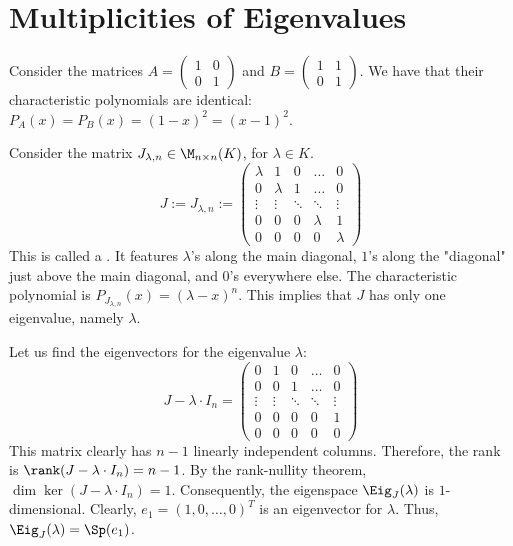 \section{Multiplicities of Eigenvalues}

\begin{example}\label{ex:char_poly_same}
  Consider the matrices $A = \left(\begin{smallmatrix} 1 & 0 \\ 0 & 1 \end{smallmatrix}\right)$ and $B = \left(\begin{smallmatrix} 1 & 1 \\ 0 & 1 \end{smallmatrix}\right)$.
  We have that their characteristic polynomials are identical: $P_A(x) = P_B(x) = (1-x)^2 = (x-1)^2$.
\end{example}

\begin{example}\label{ex:jordan_block_mult}
  Consider the matrix $J_{\lambda, n} \in \M_{n \times n}(K)$, for $\lambda \in K$.
  \begin{equation} \label{eq:jordan_block}
    J := J_{\lambda,n} := \begin{pmatrix} \lambda & 1 & 0 & \dots & 0 \\ 0 & \lambda & 1 & \dots & 0 \\ \vdots & \vdots & \ddots & \ddots & \vdots \\ 0 & 0 & 0 & \lambda & 1 \\ 0 & 0 & 0 & 0 & \lambda \end{pmatrix}
  \end{equation}
  This is called a . It features $\lambda$'s along the main diagonal, $1$'s along the "diagonal" just above the main diagonal, and $0$'s everywhere else.
  The characteristic polynomial is $P_{J_{\lambda, n}}(x) = (\lambda - x)^n$. This implies that $J$ has only one eigenvalue, namely $\lambda$.

  Let us find the eigenvectors for the eigenvalue $\lambda$:
  \[ J - \lambda \cdot I_n = \begin{pmatrix} 0 & 1 & 0 & \dots & 0 \\ 0 & 0 & 1 & \dots & 0 \\ \vdots & \vdots & \ddots & \ddots & \vdots \\ 0 & 0 & 0 & 0 & 1 \\ 0 & 0 & 0 & 0 & 0 \end{pmatrix} \]
  This matrix clearly has $n-1$ linearly independent columns.
  Therefore, the rank is $\rank(J - \lambda \cdot I_n) = n - 1$.
  By the rank-nullity theorem, $\dim \ker(J - \lambda \cdot I_n) = 1$.
  Consequently, the eigenspace $\Eig_J(\lambda)$ is $1$-dimensional.
  Clearly, $e_1 = (1, 0, \dots, 0)^T$ is an eigenvector for $\lambda$.
  Thus, $\Eig_J(\lambda) = \Sp(e_1)$.
\end{example}

